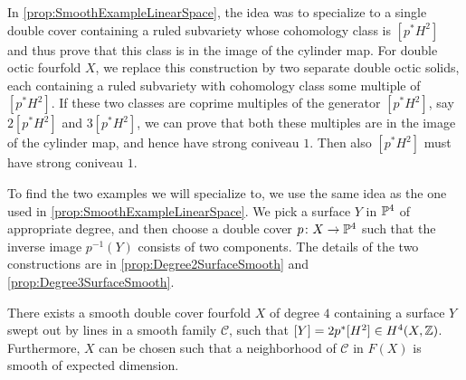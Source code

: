 In \cref{prop:SmoothExampleLinearSpace}, the idea was to specialize to a single double cover containing a ruled subvariety whose cohomology class is $[p^*H^2]$ and thus prove that this class is in the image of the cylinder map. For double octic fourfold $X$, we replace this construction by two separate double octic solids, each containing a ruled subvariety with cohomology class some multiple of $[p^*H^2]$.  If these two classes are coprime multiples of the generator $[p^*H^2]$, say $2[p^*H^2]$ and $3[p^*H^2]$, we can prove that both these multiples are in the image of the cylinder map, and hence have strong coniveau $1$. Then also $[p^*H^2]$ must have strong coniveau $1$.

To find the two examples we will specialize to, we use the same idea as the one used in \cref{prop:SmoothExampleLinearSpace}. We pick a surface $Y$ in $\P^4$ of appropriate degree, and then choose a double cover $p \from X \to \P^4$ such that the inverse image $p^{-1}(Y)$ consists of two components. The details of the two constructions are in \cref{prop:Degree2SurfaceSmooth} and \cref{prop:Degree3SurfaceSmooth}.
\begin{proposition}
	\label{prop:Degree2SurfaceSmooth}
  There exists a smooth double cover fourfold $X$ of degree $4$ containing a surface $Y$ swept out by lines in a smooth family $\mathcal{C}$, such that $[Y] = 2p^*[H^2] \in H^4(X,\Z)$. Furthermore, $X$ can be chosen such that a neighborhood of $\mathcal{C}$ in $F(X)$ is smooth of expected dimension.
\end{proposition}
